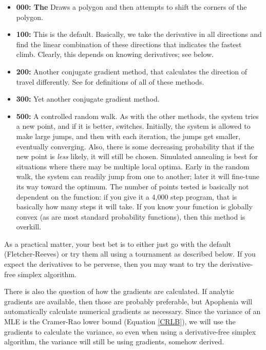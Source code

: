 \begin{itemize}
\item {\bf 000: The } Draws a polygon and then attempts to shift the corners of the polygon.
\item {\bf 100: } This is the
default. Basically, we take the derivative in all directions and find
the linear combination of these directions that indicates the fastest
climb. Clearly, this depends on knowing derivatives; see below.
\item {\bf 200: }  Another conjugate gradient method, that calculates the direction of travel differently. See \cite{avriel:nonlinear} for definitions of all of these methods.
\item {\bf 300: } Yet another conjugate gradient method.
\item {\bf 500: } A controlled random walk.
As with the other methods, the system tries a new point, and if it
is better, switches. Initially, the system is allowed to make large
jumps, and then with each iteration, the jumps get smaller, eventually
converging. Also, there is some decreasing probability that if the new
point is {\em less} likely, it will still be chosen. Simulated annealing
is best for situations where there may be multiple local optima. Early
in the random walk, the system can readily jump from one to another;
later it will fine-tune its way toward the optimum. The number of points
tested is basically not dependent on the function: if you give it a
4,000 step program, that is basically how many steps it will take.
If you know your function is globally convex (as are most standard
probability functions), then this method is overkill.
\end{itemize}

As a practical matter, your best bet is to either just go with the default (Fletcher-Reeves) or try them all using a tournament as described below. 
If you expect the derivatives to be perverse, then you may want to try the derivative-free simplex algorithm.

There is also the question of how the gradients are calculated. If
analytic gradients are available, then those are probably preferable, but
Apophenia will automatically calculate numerical gradients as necessary.
Since the variance of an MLE is the Cramer-Rao lower bound (Equation
\ref{CRLB}), we will use
the gradients to calculate the variance, so even when using a
derivative-free simplex algorithm, the variance will still be using
gradients, somehow derived.


